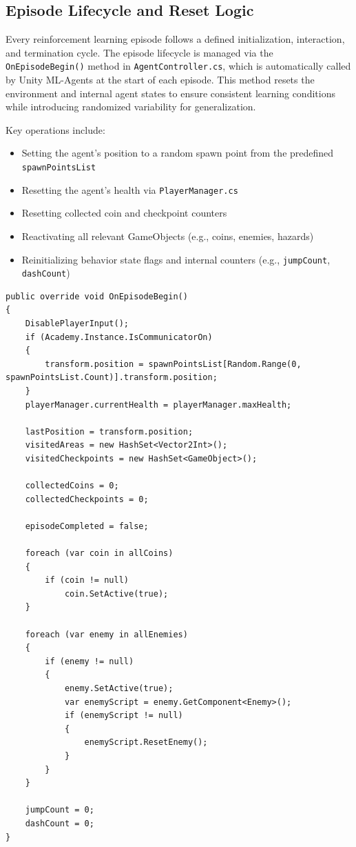 \documentclass[12pt,oneside,openright,a4paper]{cpe-english-project}
\begin{document}
\subsection{Episode Lifecycle and Reset Logic}

Every reinforcement learning episode follows a defined initialization, interaction, and termination cycle. The episode lifecycle is managed via the \texttt{OnEpisodeBegin()} method in \texttt{AgentController.cs}, which is automatically called by Unity ML-Agents at the start of each episode. This method resets the environment and internal agent states to ensure consistent learning conditions while introducing randomized variability for generalization.

Key operations include:

\begin{itemize}
\item Setting the agent’s position to a random spawn point from the predefined \texttt{spawnPointsList}
\item Resetting the agent’s health via \texttt{PlayerManager.cs}
\item Resetting collected coin and checkpoint counters
\item Reactivating all relevant GameObjects (e.g., coins, enemies, hazards)
\item Reinitializing behavior state flags and internal counters (e.g., \texttt{jumpCount}, \texttt{dashCount})
\end{itemize}

\begin{lstlisting}[language={[Sharp]C}]
public override void OnEpisodeBegin()
{
	DisablePlayerInput();
	if (Academy.Instance.IsCommunicatorOn)
	{
		transform.position = spawnPointsList[Random.Range(0, spawnPointsList.Count)].transform.position;
	}
	playerManager.currentHealth = playerManager.maxHealth;

	lastPosition = transform.position;
	visitedAreas = new HashSet<Vector2Int>();
	visitedCheckpoints = new HashSet<GameObject>();
	
	collectedCoins = 0;
	collectedCheckpoints = 0;
	
	episodeCompleted = false;
	
	foreach (var coin in allCoins)
	{
		if (coin != null)
			coin.SetActive(true);
	}
	
	foreach (var enemy in allEnemies)
	{
		if (enemy != null)
		{
			enemy.SetActive(true);
			var enemyScript = enemy.GetComponent<Enemy>();
			if (enemyScript != null)
			{
				enemyScript.ResetEnemy();
			}
		}
	}
	
	jumpCount = 0;
	dashCount = 0;
}
\end{lstlisting}
\end{document}
